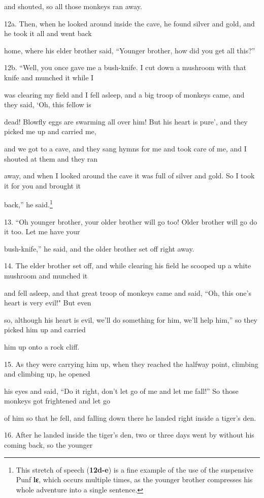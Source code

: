 and shouted, so all those monkeys ran away.

12a. Then, when he looked around inside the cave, he found silver and gold, and
he took it all and went back

home, where his elder brother said, ``Younger brother, how did you get all this?''


12b. ``Well, you once gave me a bush-knife. I cut down a mushroom with that knife
and munched it while I

was clearing my field and I fell asleep, and a big troop of monkeys came, and they
said, `Oh, this fellow is

dead! Blowfly eggs are swarming all over him! But his heart is pure', and they
picked me up and carried me,

and we got to a cave, and they sang hymns for me and took care of me, and I shouted
at them and they ran

away, and when I looked around the cave it was full of silver and gold. So I took
it for you and brought it

back,'' he said.\footnote{This stretch of speech (\textbf{12d-e}) is a fine example of the use of the suspensive Punf \textbf{lɛ}, which occurs multiple times, as the younger brother compresses his whole adventure into a single sentence.}

13. ``Oh younger brother, your older brother will go too! Older brother will go
do it too. Let me have your

bush-knife,'' he said, and the older brother set off right away.

14. The elder brother set off, and while clearing his field he scooped up a white
mushroom and munched it

and fell asleep, and that great troop of monkeys came and said, ``Oh, this one's
heart is very evil!" But even

so, although his heart is evil, we'll do something for him, we'll help him,''
so they picked him up and carried

him up onto a rock cliff.

15. As they were carrying him up, when they reached the halfway point, climbing
and climbing up, he opened

his eyes and said, ``Do it right, don't let go of me and let me fall!'' So those
monkeys got frightened and let go

of him so that he fell, and falling down there he landed right inside a tiger's
den.

16. After he landed inside the tiger's den, two or three days went by without his
coming back, so the younger

